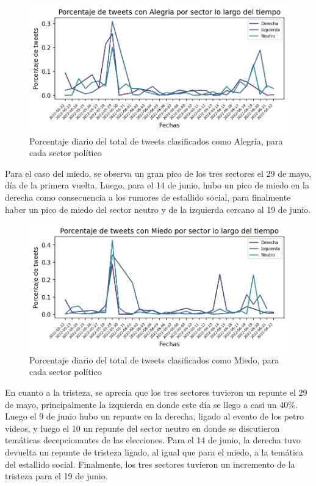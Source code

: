 \begin{figure}[t]
	\centering
	\includegraphics{Images & Logos/Results/Porcentaje de tweets con Alegria por sector lo largo del tiempo.png} 
	\caption{Porcentaje diario del total de tweets clasificados como Alegría, para cada sector político}
	\label{figure:tweets_percent_alegria_tiempo}
\end{figure}


Para el caso del miedo, se observa un gran pico de los tres sectores el 29 de mayo, día de la primera vuelta. Luego, para el 14 de junio, hubo un pico de miedo en la derecha como consecuencia a los rumores de estallido social, para finalmente haber un pico de miedo del sector neutro y de la izquierda cercano al 19 de junio.

\begin{figure}[t]
	\centering
	\includegraphics{Images & Logos/Results/Porcentaje de tweets con Miedo por sector lo largo del tiempo.png} 
	\caption{Porcentaje diario del total de tweets clasificados como Miedo, para cada sector político}
	\label{figure:tweets_percent_Miedo_tiempo}
\end{figure}


En cuanto a la tristeza, se aprecia que los tres sectores tuvieron un repunte el 29 de mayo, principalmente la izquierda en donde este día se llego a casi un 40\%. Luego el 9 de junio hubo un repunte en la derecha, ligado al evento de los petro videos, y luego el 10 un repunte del sector neutro en donde se discutieron temáticas decepcionantes de las elecciones. Para el 14 de junio, la derecha tuvo devuelta un repunte de tristeza ligado, al igual que para el miedo, a la temática del estallido social. Finalmente, los tres sectores tuvieron un incremento de la tristeza para el 19 de junio.

